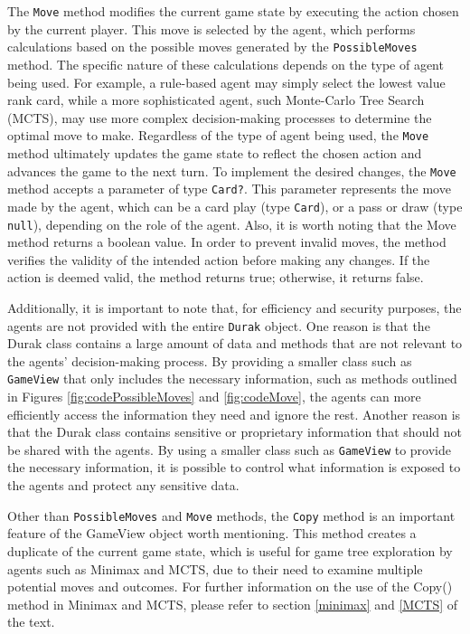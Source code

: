The \texttt{Move} method modifies the current game state by executing the action chosen by the current player. This move is selected by the agent, which performs calculations based on the possible moves generated by the \texttt{PossibleMoves} method. The specific nature of these calculations depends on the type of agent being used. For example, a rule-based agent may simply select the lowest value rank card, while a more sophisticated agent, such Monte-Carlo Tree Search (MCTS), may use more complex decision-making processes to determine the optimal move to make. Regardless of the type of agent being used, the \texttt{Move} method ultimately updates the game state to reflect the chosen action and advances the game to the next turn. To implement the desired changes, the \texttt{Move} method accepts a parameter of type \texttt{Card?}. This parameter represents the move made by the agent, which can be a card play (type \texttt{Card}), or a pass or draw (type \texttt{null}), depending on the role of the agent. Also, it is worth noting that the Move method returns a boolean value. In order to prevent invalid moves, the method verifies the validity of the intended action before making any changes. If the action is deemed valid, the method returns true; otherwise, it returns false.

Additionally, it is important to note that, for efficiency and security purposes, the agents are not provided with the entire \texttt{Durak} object. One reason is that the Durak class contains a large amount of data and methods that are not relevant to the agents' decision-making process. By providing a smaller class such as \texttt{GameView} that only includes the necessary information, such as methods outlined in Figures \ref{fig:codePossibleMoves} and \ref{fig:codeMove}, the agents can more efficiently access the information they need and ignore the rest. Another reason is that the Durak class contains sensitive or proprietary information that should not be shared with the agents. By using a smaller class such as \texttt{GameView} to provide the necessary information, it is possible to control what information is exposed to the agents and protect any sensitive data.

Other than \texttt{PossibleMoves} and \texttt{Move} methods, the \texttt{Copy} method is an important feature of the GameView object worth mentioning. This method creates a duplicate of the current game state, which is useful for game tree exploration by agents such as Minimax and MCTS, due to their need to examine multiple potential moves and outcomes. For further information on the use of the Copy() method in Minimax and MCTS, please refer to section \ref{minimax} and \ref{MCTS} of the text.

